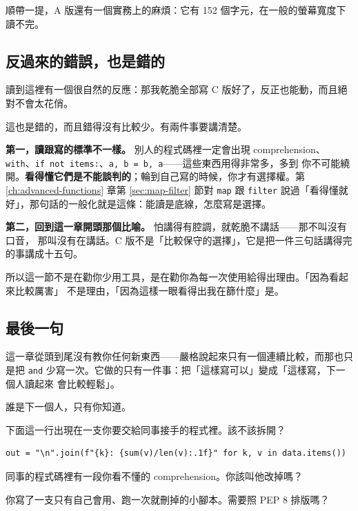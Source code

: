 順帶一提，A 版還有一個實務上的麻煩：它有 152 個字元，在一般的螢幕寬度下讀不完。

\subsection*{反過來的錯誤，也是錯的}

讀到這裡有一個很自然的反應：那我乾脆全部寫 C 版好了，反正也能動，而且絕對不會太花俏。

這也是錯的，而且錯得沒有比較少。有兩件事要講清楚。

\textbf{第一，讀跟寫的標準不一樣。} 別人的程式碼裡一定會出現 comprehension、
\texttt{with}、\texttt{if not items:}、\texttt{a, b = b, a}——這些東西用得非常多，多到
你不可能繞開。\textbf{看得懂它們是不能談判的}；輪到自己寫的時候，你才有選擇權。第
\ref{ch:advanced-functions} 章第 \ref{sec:map-filter} 節對 \texttt{map} 跟 \texttt{filter}
說過「看得懂就好」，那句話的一般化就是這條：能讀是底線，怎麼寫是選擇。

\textbf{第二，回到這一章開頭那個比喻。} 怕講得有腔調，就乾脆不講話——那不叫沒有口音，
那叫沒有在講話。C 版不是「比較保守的選擇」，它是把一件三句話講得完的事講成十五句。

所以這一節不是在勸你少用工具，是在勸你為每一次使用給得出理由。「因為看起來比較厲害」
不是理由，「因為這樣一眼看得出我在篩什麼」是。

\subsection*{最後一句}

這一章從頭到尾沒有教你任何新東西——嚴格說起來只有一個連續比較，而那也只是把
\texttt{and} 少寫一次。它做的只有一件事：把「這樣寫可以」變成「這樣寫，下一個人讀起來
會比較輕鬆」。

誰是下一個人，只有你知道。

\begin{drills}[label=drills:not-too-pythonic]
\item 下面這一行出現在一支你要交給同事接手的程式裡。該不該拆開？
\begin{verbatim}
out = "\n".join(f"{k}: {sum(v)/len(v):.1f}" for k, v in data.items())
\end{verbatim}
\item 同事的程式碼裡有一段你看不懂的 comprehension。你該叫他改掉嗎？
\item 你寫了一支只有自己會用、跑一次就刪掉的小腳本。需要照 PEP 8 排版嗎？
\end{drills}


